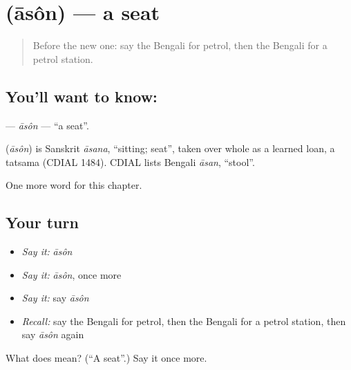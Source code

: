 \section[\texorpdfstring{\bn{আসন} (āsôn)}{আসন (āsôn)}]{ (āsôn) — a seat}

\label{lesson:BN-C198-ason}



\begin{quote}
Before the new one: say the Bengali for petrol, then the Bengali for a petrol station.
\end{quote}

\subsection*{You'll want to know: }
\textbf{} — \emph{āsôn} — \textquotedblleft{}a seat\textquotedblright{}.

\begin{cousinweb}
\textbf{} (\emph{āsôn}) is Sanskrit \emph{āsana}, \textquotedblleft{}sitting; seat\textquotedblright{}, taken over whole as a learned loan, a tatsama (CDIAL 1484). CDIAL lists Bengali \emph{āsan}, \textquotedblleft{}stool\textquotedblright{}.
\end{cousinweb}

\begin{grammarlens}[title={What you've built}]
One more word for this chapter.
\end{grammarlens}

\subsection*{Your turn}
\begin{itemize}
\raggedright
  \item \emph{Say it:} \emph{āsôn}
  \item \emph{Say it:} \emph{āsôn}, once more
  \item \emph{Say it:} say \emph{āsôn}
  \item \emph{Recall:} say the Bengali for petrol, then the Bengali for a petrol station, then say \emph{āsôn} again
\end{itemize}

\begin{tcolorbox}[breakable,colback=teal!4,colframe=teal!35!black,title={Before you move on}]
What does  mean? (\textquotedblleft{}A seat\textquotedblright{}.) Say it once more.
\end{tcolorbox}
